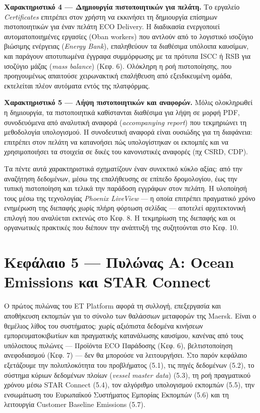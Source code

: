 \documentclass[11pt,a4paper,greek,twoside]{template-xe}
\begin{document}
\textbf{Χαρακτηριστικό 4 --- Δημιουργία πιστοποιητικών για πελάτη.} Το
εργαλείο \emph{Certificates} επιτρέπει στον χρήστη να εκκινήσει τη
δημιουργία επίσημων πιστοποιητικών για έναν πελάτη ECO Delivery. Η
διαδικασία ενεργοποιεί αυτοματοποιημένες εργασίες (Oban workers) που
αντλούν από το λογιστικό ισοζύγιο βιώσιμης ενέργειας (\emph{Energy
Bank}), επαληθεύουν τα διαθέσιμα υπόλοιπα καυσίμων, και παράγουν
αποτυπωμένα έγγραφα συμμόρφωσης με τα πρότυπα ISCC ή RSB για ισοζύγιο
μάζας (\emph{mass balance}) (Κεφ. 6). Ολόκληρη η ροή πιστοποίησης, που
προηγουμένως απαιτούσε χειρωνακτική επαλήθευση από εξειδικευμένη ομάδα,
εκτελείται πλέον αυτόματα εντός της πλατφόρμας.

\textbf{Χαρακτηριστικό 5 --- Λήψη πιστοποιητικών και αναφορών.} Μόλις
ολοκληρωθεί η δημιουργία, τα πιστοποιητικά καθίστανται διαθέσιμα για
λήψη σε μορφή PDF, συνοδευόμενα από αναλυτική αναφορά
(\emph{accompanying report}) που τεκμηριώνει τη μεθοδολογία υπολογισμού.
Η συνοδευτική αναφορά είναι ουσιώδης για τη διαφάνεια: επιτρέπει στον
πελάτη να κατανοήσει πώς υπολογίστηκαν οι εκπομπές και να χρησιμοποιήσει
τα στοιχεία σε δικές του κανονιστικές αναφορές (πχ CSRD, CDP).

Τα πέντε αυτά χαρακτηριστικά σχηματίζουν έναν συνεκτικό κύκλο αξίας: από
την αναζήτηση δεδομένων, μέσω της επαλήθευσης σε επίπεδο δρομολογίου,
έως την τυπική πιστοποίηση και τελικά την παράδοση εγγράφων στον πελάτη.
Η υλοποίησή τους μέσω της τεχνολογίας \emph{Phoenix LiveView} --- η
οποία επιτρέπει πραγματικό χρόνο ενημέρωση της διεπαφής χωρίς πλήρη
φόρτωση σελίδας --- αποτελεί αρχιτεκτονική επιλογή που αναλύεται εκτενώς
στο Κεφ. 8. Η τεκμηρίωση της διεπαφής και οι οργανωτικές πρακτικές που
διέπουν την ανάπτυξή της συζητούνται στο Κεφ. 10.

\pagebreak

\chapter{Κεφάλαιο 5 --- Πυλώνας Α: Ocean Emissions και STAR
Connect}\label{ux3baux3b5ux3c6ux3acux3bbux3b1ux3b9ux3bf-5-ux3c0ux3c5ux3bbux3ceux3bdux3b1ux3c2-ux3b1-ocean-emissions-ux3baux3b1ux3b9-star-connect}

Ο πρώτος πυλώνας του ET Platform αφορά τη συλλογή, επεξεργασία και
αποθήκευση εκπομπών για το σύνολο των θαλάσσιων μεταφορών της Maersk.
Είναι ο θεμέλιος λίθος του συστήματος: χωρίς αξιόπιστα δεδομένα κινήσεων
εμπορευματοκιβωτίων και πραγματικής κατανάλωσης καυσίμου, κανένας από
τους υπόλοιπους πυλώνες --- Προϊόντα ECO Παράδοσης (Κεφ. 6),
βελτιστοποίηση ανεφοδιασμού (Κεφ. 7) --- δεν θα μπορούσε να
λειτουργήσει. Στο παρόν κεφάλαιο εξετάζουμε την πολυπλοκότητα του
προβλήματος (5.1), τις πηγές δεδομένων (5.2), το σύστημα κύριων
δεδομένων πλοίων (\emph{vessel master data}) (5.3), τη ροή πραγματικού
χρόνου μέσω STAR Connect (5.4), τον αλγόριθμο υπολογισμού εκπομπών
(5.5), την ενσωμάτωση του Ευρωπαϊκού Συστήματος Εμπορίας Εκπομπών (5.6)
και τη λειτουργία Customer Baseline Emissions (5.7).
\end{document}

